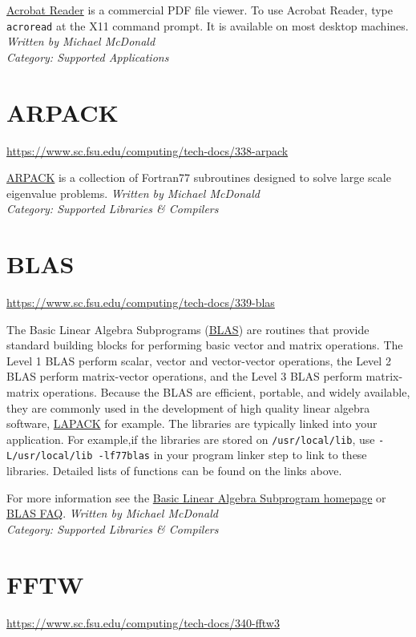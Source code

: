 \documentclass[12pt,a4paper]{article}
\begin{document}
\href{https://acrobat.adobe.com/us/en/acrobat/pdf-reader.html}{Acrobat Reader} is a commercial PDF file viewer. To use Acrobat Reader, type \texttt{acroread} at the X11 command prompt. It is available on most desktop machines.
\hfill \textit{Written by Michael McDonald} \\
\hfill \textit{Category: Supported Applications}

\section{ARPACK}
\url{https://www.sc.fsu.edu/computing/tech-docs/338-arpack}

\href{http://www.caam.rice.edu/software/ARPACK/}{ARPACK} is a collection of Fortran77 subroutines designed to solve large scale eigenvalue problems.
\hfill \textit{Written by Michael McDonald} \\
\hfill \textit{Category: Supported Libraries \& Compilers}

\section{BLAS}
\url{https://www.sc.fsu.edu/computing/tech-docs/339-blas}

The Basic Linear Algebra Subprograms (\href{http://www.netlib.org/blas/}{BLAS}) are routines that provide standard building blocks for performing basic vector and matrix operations. The Level 1 BLAS perform scalar, vector and vector-vector operations, the Level 2 BLAS perform matrix-vector operations, and the Level 3 BLAS perform matrix-matrix operations. Because the BLAS are efficient, portable, and widely available, they are commonly used in the development of high quality linear algebra software, \href{http://www.netlib.org/lapack/}{LAPACK} for example. The libraries are typically linked into your application. For example,if the libraries are stored on \texttt{/usr/local/lib}, use \texttt{-L/usr/local/lib -lf77blas} in your program linker step to link to these libraries. Detailed lists of functions can be found on the links above.

For more information see the \href{http://www.netlib.org/blas/}{Basic Linear Algebra Subprogram homepage} or \href{http://www.netlib.org/blas/faq.html}{BLAS FAQ}.
\hfill \textit{Written by Michael McDonald} \\
\hfill \textit{Category: Supported Libraries \& Compilers}

\section{FFTW}
\url{https://www.sc.fsu.edu/computing/tech-docs/340-fftw3}
\end{document}
